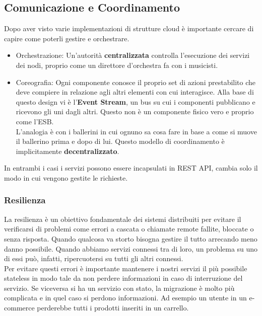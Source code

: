 \documentclass{article}
\begin{document}
		\subsection{Comunicazione e Coordinamento}
		Dopo aver visto varie implementazioni di strutture cloud è importante cercare di capire come poterli gestire e orchestrare.
		\begin{itemize}
		    \item Orchestrazione: Un'autorità \textbf{centralizzata} controlla l'esecuzione dei servizi dei nodi, proprio come un direttore d'orchestra fa con i musicisti.
		    \item Coreografia: Ogni componente conosce il proprio set di azioni prestabilito che deve compiere in relazione agli altri elementi con cui interagisce. Alla base di questo design vi è l'\textbf{Event Stream}, un bus su cui i componenti pubblicano e ricevono gli uni dagli altri. Questo non è un componente fisico vero e proprio come l'ESB.\\
		    L'analogia è con i ballerini in cui ognuno sa cosa fare in base a come si muove il ballerino prima e dopo di lui. Questo modello di coordinamento è implicitamente \textbf{decentralizzato}.
		\end{itemize}
		
		In entrambi i casi i servizi possono essere incapsulati in REST API, cambia solo il modo in cui vengono gestite le richieste.

		\subsubsection{Resilienza}
		La resilienza è un obiettivo fondamentale dei sistemi distribuiti per evitare il verificarsi di problemi come errori a cascata o chiamate remote fallite, bloccate o senza risposta.
		Quando qualcosa va storto bisogna gestire il tutto arrecando meno danno possibile. Quando abbiamo servizi connessi tra di loro, un problema su uno di essi può, infatti, ripercuotersi su tutti gli altri connessi.\\
		
		Per evitare questi errori è importante mantenere i nostri servizi il più possibile stateless in modo tale da non perdere informazioni in caso di interruzione del servizio.
		Se viceversa si ha un servizio con stato, la migrazione è molto più complicata e in quel caso si perdono informazioni. Ad esempio un utente in un e-commerce perderebbe tutti i prodotti inseriti in un carrello.\\
		
\end{document}
